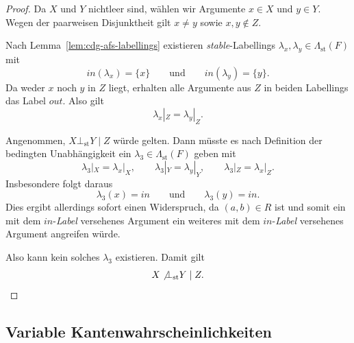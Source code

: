 \begin{proof}
    Da \(X\) und \(Y\) nichtleer sind, wählen wir Argumente
    \(x\in X\) und \(y\in Y\). Wegen der paarweisen Disjunktheit gilt
    \(x\neq y\) sowie \(x,y\notin Z\).

    Nach Lemma~\ref{lem:cdg-afs-labellings} existieren
    \textit{stable}-Labellings \(\lambda_x,\lambda_y\in
    \Lambda_{\mathrm{st}}(F)\) mit
    \[
        \mathit{in}(\lambda_x)=\{x\}
        \qquad\text{und}\qquad
        \mathit{in}(\lambda_y)=\{y\}.
    \]
    Da weder \(x\) noch \(y\) in \(Z\) liegt, erhalten alle Argumente aus
    \(Z\) in beiden Labellings das Label \(\mathit{out}\). Also gilt
    \[
        \lambda_x|_Z=\lambda_y|_Z.
    \]

    Angenommen, \(X\bot_{\mathrm{st}}Y\mid Z\) würde gelten. Dann müsste es
    nach Definition der bedingten Unabhängigkeit ein
    \(\lambda_3\in\Lambda_{\mathrm{st}}(F)\) geben mit
    \[
        \lambda_3|_X=\lambda_x|_X,
        \qquad
        \lambda_3|_Y=\lambda_y|_Y,
        \qquad
        \lambda_3|_Z=\lambda_x|_Z.
    \]
    Insbesondere folgt daraus
    \[
        \lambda_3(x)=\mathit{in}
        \qquad\text{und}\qquad
        \lambda_3(y)=\mathit{in}.
    \]
    Dies ergibt allerdings sofort einen Widerspruch, da \((a,b) \in R\) ist und somit ein mit dem \(\mathit{in}\)-\emph{Label} versehenes Argument ein weiteres mit
    dem \(\mathit{in}\)-\emph{Label} versehenes Argument angreifen würde.  

    Also kann kein solches \(\lambda_3\) existieren. Damit gilt
    \[
        X\not\bot_{\mathrm{st}}Y\mid Z.
    \]
\end{proof}

\subsection{Variable Kantenwahrscheinlichkeiten}

